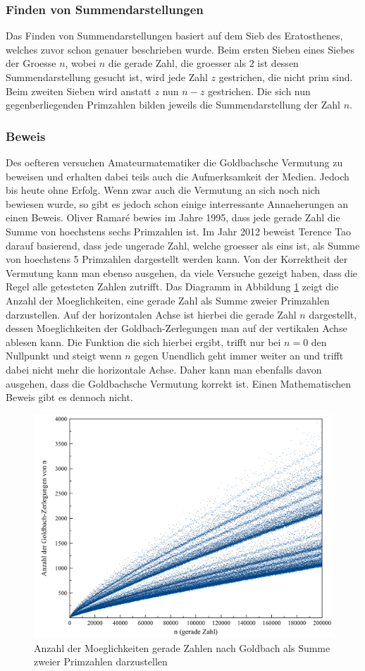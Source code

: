 \subsubsection{Finden von Summendarstellungen}
Das Finden von Summendarstellungen basiert auf dem Sieb des Eratosthenes, welches zuvor schon genauer beschrieben wurde. Beim ersten Sieben eines Siebes der Groesse $n$, wobei $n$ die gerade Zahl, die groesser als $2$ ist dessen Summendarstellung gesucht ist, wird jede Zahl $z$ gestrichen, die nicht prim sind. Beim zweiten Sieben wird anstatt $z$ nun $n - z$ gestrichen. Die sich nun gegenberliegenden Primzahlen bilden jeweils die Summendarstellung der Zahl $n$.
\subsubsection{Beweis}
Des oefteren versuchen Amateurmatematiker die Goldbachsche Vermutung zu beweisen und erhalten dabei teils auch die Aufmerksamkeit der Medien. Jedoch bis heute ohne Erfolg. Wenn zwar auch die Vermutung an sich noch nich bewiesen wurde, so gibt es jedoch schon einige interressante Annaeherungen an einen Beweis.
Oliver Ramaré bewies im Jahre 1995, dass jede gerade Zahl die Summe von hoechstens sechs Primzahlen ist. Im Jahr 2012 beweist Terence Tao darauf basierend, dass jede ungerade Zahl, welche groesser als eins ist, als Summe von hoechstens 5 Primzahlen dargestellt werden kann.
Von der Korrektheit der Vermutung kann man ebenso ausgehen, da viele Versuche gezeigt haben, dass die Regel alle getesteten Zahlen zutrifft. Das Diagramm in Abbildung \ref{fig:goldbach_diagramm} zeigt die Anzahl der Moeglichkeiten, eine gerade Zahl als Summe zweier Primzahlen darzustellen. Auf der horizontalen Achse ist hierbei die gerade Zahl $n$ dargestellt, dessen Moeglichkeiten der Goldbach-Zerlegungen man auf der vertikalen Achse ablesen kann. Die Funktion die sich hierbei ergibt, trifft nur bei $n = 0$ den Nullpunkt und steigt wenn $n$ gegen Unendlich geht immer weiter an und trifft dabei nicht mehr die horizontale Achse. Daher kann man ebenfalls davon ausgehen, dass die Goldbachsche Vermutung korrekt ist. Einen Mathematischen Beweis gibt es dennoch nicht.
\begin{figure}
\includegraphics[width=0.8\linewidth]{img/Goldbach200000.png}
\caption{Anzahl der Moeglichkeiten gerade Zahlen nach Goldbach als Summe zweier Primzahlen darzustellen}
\label{fig:goldbach_diagramm}
\end{figure}
